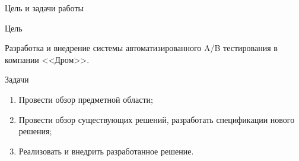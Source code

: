 \documentclass[12pt, unicode]{beamer}
\newif\ifmetropolis
\begin{document}
	\begin{frame}[fragile]{Цель и задачи работы}
		\begin{block}{Цель}
			\ifmetropolis
				\smallskip
			\fi
			Разработка и внедрение системы автоматизированного A/B тестирования в компании <<Дром>>.
		\end{block}
		\begin{block}{Задачи}
			\begin{enumerate}
				\item Провести обзор предметной области;
				\item Провести обзор существующих решений, разработать спецификации нового решения;
				\item Реализовать и внедрить разработанное решение.
			\end{enumerate}
		\end{block}
	\end{frame}
	
    
\end{document}
